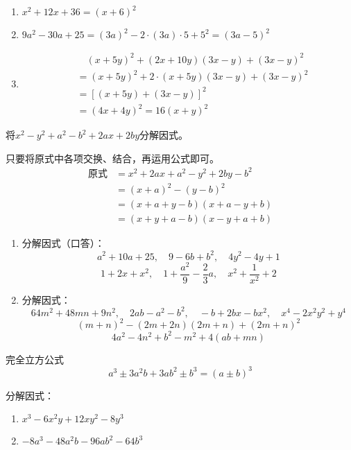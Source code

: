 \begin{solution}
    \begin{enumerate}
        \item $x^2+12x+36=(x+6)^2$
        \item $9a^2-30a+25=(3a)^2-2\cdot (3a)\cdot 5+5^2=(3a-5)^2$
        \item \[\begin{split}
           &\quad  (x+5y)^2+(2x+10y)(3x-y)+(3x-y)^2\\
           &=(x+5y)^2+2\cdot (x+5y)(3x-y) +(3x-y) ^2\\
           &=[(x+5y) +(3x-y) ]^2\\
           &=(4x+4y)^2=16(x+y)^2          
        \end{split}\]
    \end{enumerate}
\end{solution}


\begin{example}
将$x^2-y^2+a^2-b^2+2ax+2by$分解因式。
\end{example}


\begin{solution}
    只要将原式中各项交换、结合，再运用公式即可。
\[\begin{split}
  \text{原式}&=x^2+2ax+a^2-y^2+2by-b^2\\
  &=(x+a)^2-(y-b)^2\\
  &=(x+a+y-b)(x+a-y+b)\\
  &=(x+y+a-b)(x-y+a+b)  
\end{split}\]
\end{solution}

\begin{ex}
\begin{enumerate}
    \item 分解因式（口答）：
    \[a^2+10a+25,\quad 9-6b+b^2,\quad 4y^2-4y+1\]
    \[1+2x+x^2,\quad 1+\frac{a^2}{9}-\frac{2}{3}a,\quad x^2+\frac{1}{x^2}+2\] 
    \item 分解因式：
     \[64m^2+48mn+9n^2,\quad 2ab-a^2-b^2,\quad -b+2bx-bx^2,\quad x^4-2x^2y^2+y^4\] 
     \[(m+n)^2-(2m+2n)(2m+n)+(2m+n)^2\]\[ 4a^2-4n^2+b^2-m^2+4(ab+mn) \]
\end{enumerate}
\end{ex}

\begin{blk}{完全立方公式}
\[a^3\pm 3a^2b+3ab^2\pm b^3=(a\pm b)^3\]
\end{blk}

\begin{example}
    分解因式：
    \begin{enumerate}
        \item $x^3-6x^2y+12xy^2-8y^3$
        \item $-8a^3-48a^2b-96ab^2-64b^3$
    \end{enumerate}
\end{example}

